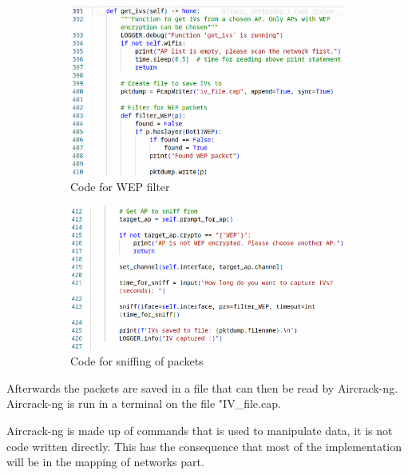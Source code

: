 \begin{figure}[!htbp]
     \centering
     \begin{subfigure}{0.49\textwidth}
         \centering
         \includegraphics[width=\textwidth]{Latex-Files/Billeder/Implementation/Code1.png}
         \caption{Code for WEP filter}
         \label{WEP_code1}
     \end{subfigure}
     \hfill
     \begin{subfigure}{0.49\textwidth}
         \centering
         \includegraphics[width=\textwidth]{Latex-Files/Billeder/Implementation/Code2.png}
         \caption{Code for sniffing of packets}
         \label{WEP_code2}
     \end{subfigure}
     \hfill
     \caption{}
\end{figure}


Afterwards the packets are saved in a file that can then be read by Aircrack-ng. Aircrack-ng is run in a terminal on the file "IV\_file.cap.

Aircrack-ng is made up of commands that is used to manipulate data, it is not code written directly. This has the consequence that most of the implementation will be in the mapping of networks part. 

